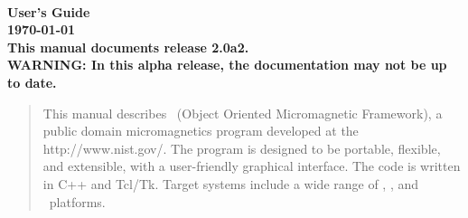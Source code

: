 
\usepackage{l2hbugs}

%
%
%
\usepackage{tocloft}
\newlength{\oommftocsslen}
\setlength{\oommftocsslen}{0.5em} %
\renewcommand{\cftsubsecpresnum}{\hfill} %
\renewcommand{\cftsubsecaftersnum}{\hspace*{\oommftocsslen}}
\addtolength{\cftsubsecnumwidth}{\oommftocsslen}
%
%




\nocite{*}  %


\begin{titlepage}
\label{page:contents}
\par
\vspace*{\fill}
\begin{center}
\Large\bf
\OOMMF\\
User's Guide\\[2ex]
\large
{\today}
{}\\[2ex]
This manual documents release 2.0a2.\\[1ex]
WARNING: In this alpha release, the
documentation may not be up to date.

\end{center}
\vspace{10\baselineskip}
\begin{abstract}
This manual describes \OOMMF\ (Object Oriented Micromagnetic Framework),
a public domain micromagnetics program developed at the
{http://www.nist.gov/}.  The program is designed
to be portable, flexible, and extensible, with a user-friendly graphical
interface.  The code is written in C++ and Tcl/Tk. Target systems
include a wide range of \Unix, \Windows, and \MacOSX\ platforms.
\end{abstract}
\vspace*{\fill}
\par
\end{titlepage}

